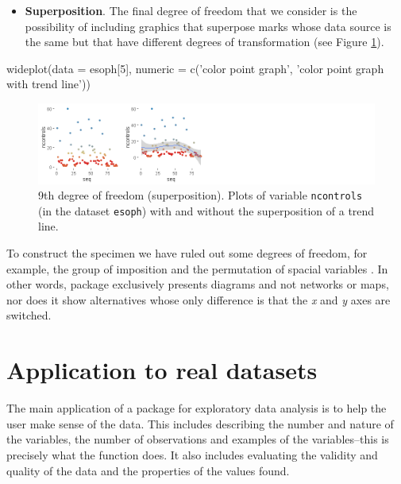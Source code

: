 \begin{itemize}
	\tightlist
	\item
	\textbf{Superposition}. The final degree of freedom that we consider
	is the possibility of including graphics that superpose marks whose
	data source is the same but that have different degrees of
	transformation (see Figure \ref{fig:dg8}).
\end{itemize}

\begin{example}
  wideplot(data = esoph[5],  
           numeric = c('color point graph', 
                       'color point graph with trend line'))
\end{example}

\begin{Schunk}
	\begin{figure}[H]
\includegraphics[width=1\linewidth]{figures/dg8-1} \caption[9th deg]{9th degree of freedom (superposition). Plots of variable \texttt{ncontrols} (in the dataset \texttt{esoph}) with and without the superposition of a trend line.}\label{fig:dg8}
	\end{figure}
\end{Schunk}

To construct the specimen we have ruled out some degrees of freedom, for
example, the group of imposition \citep[p.52]{Bertin1967} and the
permutation of spacial variables \citep[p.43]{Bertin1967}. In other
words,  package exclusively presents diagrams and not
networks or maps, nor does it show alternatives whose only difference is
that the \emph{x} and \emph{y} axes are switched.

\hypertarget{application-to-real-datasets}{%
	\section{Application to real
datasets}\label{application-to-real-datasets}}

The main application of a package for exploratory data analysis is to
help the user make sense of the data. This includes describing the
number and nature of the variables, the number of observations and
examples of the variables--this is precisely what the 
function does. It also includes evaluating the validity and quality of
the data and the properties of the values found.

